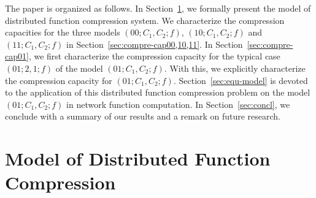 \documentclass[11pt,draftclsnofoot,onecolumn]{IEEEtran}
\begin{document}


The paper is organized as follows. In Section~\ref{sec:dis-fun-model}, we formally present the model of distributed function compression system. We characterize the compression capacities for the three models $(00;C_1,C_2;f)$, $(10;C_1,C_2;f)$ and $(11;C_1,C_2;f)$  in Section~\ref{sec:compre-cap00,10,11}. In Section~\ref{sec:compre-cap01}, we first characterize the compression capacity for the typical case $(01;2,1;f)$ of the model $(01;C_1,C_2;f)$. With this, we explicitly characterize the compression capacity for $(01;C_1,C_2;f)$. Section~\ref{sec:equ-model} is devoted to the application of this distributed function compression problem on the model $(01;C_1,C_2;f)$ in network function computation. In Section~\ref{sec:concl}, we conclude with a summary of our results and a remark on future research.




\section{Model of Distributed Function Compression}\label{sec:dis-fun-model}
\end{document}
